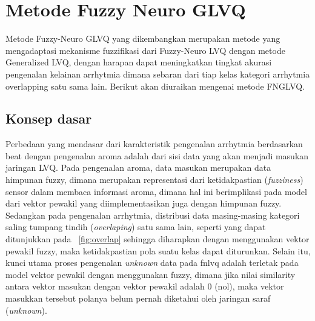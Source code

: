 \section{Metode Fuzzy Neuro GLVQ}
Metode Fuzzy-Neuro GLVQ yang dikembangkan merupakan metode yang
mengadaptasi mekanisme fuzzifikasi dari Fuzzy-Neuro LVQ dengan metode
Generalized LVQ, dengan harapan dapat meningkatkan tingkat akurasi pengenalan
kelainan arrhytmia dimana sebaran dari tiap kelas kategori arrhytmia overlapping
satu sama lain. Berikut akan diuraikan mengenai metode FNGLVQ.


\subsection{Konsep dasar}
Perbedaan yang mendasar dari karakteristik pengenalan arrhytmia berdasarkan beat
dengan pengenalan aroma adalah dari sisi data yang akan menjadi masukan
jaringan LVQ. Pada pengenalan aroma, data masukan merupakan data himpunan
fuzzy, dimana merupakan representasi dari ketidakpastian (\emph{fuzziness})
sensor dalam membaca informasi aroma, dimana hal ini berimplikasi pada model
dari vektor pewakil yang diimplementasikan juga dengan himpunan fuzzy. Sedangkan
pada pengenalan arrhytmia, distribusi data masing-masing kategori saling tumpang
tindih (\emph{overlaping}) satu sama lain, seperti yang dapat ditunjukkan pada
\pic~\ref{fig:overlap} sehingga diharapkan dengan menggunakan vektor pewakil
fuzzy, maka ketidakpastian pola suatu kelas dapat diturunkan. Selain itu, kunci
utama proses pengenalan \emph{unknown} data pada \gls{fnlvq} adalah terletak
pada model vektor pewakil dengan menggunakan fuzzy, dimana jika nilai
similarity antara vektor masukan dengan vektor pewakil adalah 0 (nol), maka
vektor masukkan tersebut polanya belum pernah diketahui oleh jaringan saraf
(\emph{unknown}).

